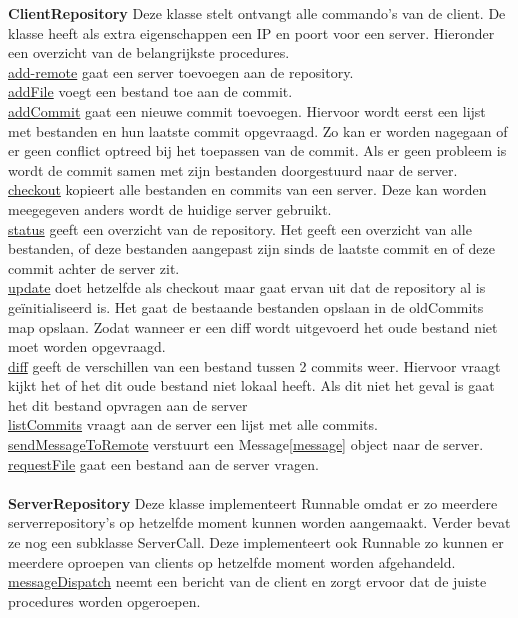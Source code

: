 \documentclass{article}
\begin{document}
\textbf{ClientRepository}\label{cr}
Deze klasse stelt ontvangt alle commando's van de client. De klasse heeft als extra eigenschappen een IP en poort voor een server. Hieronder een overzicht van de belangrijkste procedures.\\
\underline{add-remote} gaat een server toevoegen aan de repository.\\
\underline{addFile} voegt een bestand toe aan de commit.\\
\underline{addCommit} gaat een nieuwe commit toevoegen. Hiervoor wordt eerst een lijst met bestanden en hun laatste commit opgevraagd. Zo kan er worden nagegaan of er geen conflict optreed bij het toepassen van de commit. Als er geen probleem is wordt de commit samen met zijn bestanden doorgestuurd naar de server.\\
\underline{checkout} kopieert alle bestanden en commits van een server. Deze kan worden meegegeven anders wordt de huidige server gebruikt.\\
\underline{status} geeft een overzicht van de repository. Het geeft een overzicht van alle bestanden, of deze bestanden aangepast zijn sinds de laatste commit en of deze commit achter de server zit.\\
\underline{update} doet hetzelfde als checkout maar gaat ervan uit dat de repository al is ge\"{i}nitialiseerd is. Het gaat de bestaande bestanden opslaan in de oldCommits map opslaan. Zodat wanneer er een diff wordt uitgevoerd het oude bestand niet moet worden opgevraagd.\\
\underline{diff} geeft de verschillen van een bestand tussen 2 commits weer. Hiervoor vraagt kijkt het of het dit oude bestand niet lokaal heeft. Als dit niet het geval is gaat het dit bestand opvragen aan de server\\
\underline{listCommits} vraagt aan de server een lijst met alle commits. \\
\underline{sendMessageToRemote} verstuurt een Message\ref{message} object naar de server.\\
\underline{requestFile} gaat een bestand aan de server vragen.\\
\\
\textbf{ServerRepository}\label{sr} 
Deze klasse implementeert Runnable omdat er zo meerdere serverrepository's op hetzelfde moment kunnen worden aangemaakt. Verder bevat ze nog een subklasse ServerCall. Deze implementeert ook Runnable zo kunnen er meerdere oproepen van clients op hetzelfde moment worden afgehandeld.\\
\underline{messageDispatch} neemt een bericht van de client en zorgt ervoor dat de juiste procedures worden opgeroepen.\\
\end{document}
